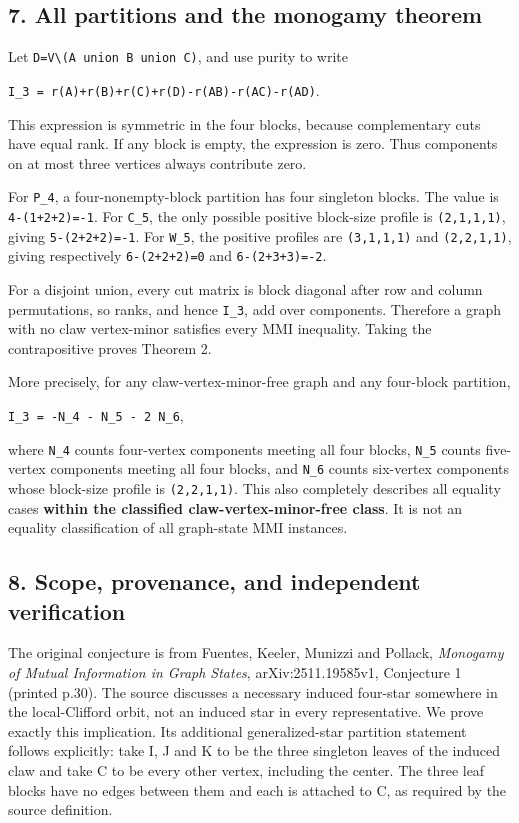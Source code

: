 \documentclass[
  11pt,
]{article}
\begin{document}
\subsection{7. All partitions and the monogamy
theorem}\label{all-partitions-and-the-monogamy-theorem}

Let \texttt{D=V\textbackslash{}(A\ union\ B\ union\ C)}, and use purity
to write

\texttt{I\_3\ =\ r(A)+r(B)+r(C)+r(D)-r(AB)-r(AC)-r(AD)}.

This expression is symmetric in the four blocks, because complementary
cuts have equal rank. If any block is empty, the expression is zero.
Thus components on at most three vertices always contribute zero.

For \texttt{P\_4}, a four-nonempty-block partition has four singleton
blocks. The value is \texttt{4-(1+2+2)=-1}. For \texttt{C\_5}, the only
possible positive block-size profile is \texttt{(2,1,1,1)}, giving
\texttt{5-(2+2+2)=-1}. For \texttt{W\_5}, the positive profiles are
\texttt{(3,1,1,1)} and \texttt{(2,2,1,1)}, giving respectively
\texttt{6-(2+2+2)=0} and \texttt{6-(2+3+3)=-2}.

For a disjoint union, every cut matrix is block diagonal after row and
column permutations, so ranks, and hence \texttt{I\_3}, add over
components. Therefore a graph with no claw vertex-minor satisfies every
MMI inequality. Taking the contrapositive proves Theorem 2.

More precisely, for any claw-vertex-minor-free graph and any four-block
partition,

\texttt{I\_3\ =\ -N\_4\ -\ N\_5\ -\ 2\ N\_6},

where \texttt{N\_4} counts four-vertex components meeting all four
blocks, \texttt{N\_5} counts five-vertex components meeting all four
blocks, and \texttt{N\_6} counts six-vertex components whose block-size
profile is \texttt{(2,2,1,1)}. This also completely describes all
equality cases \textbf{within the classified claw-vertex-minor-free
class}. It is not an equality classification of all graph-state MMI
instances.

\subsection{8. Scope, provenance, and independent
verification}\label{scope-provenance-and-independent-verification}

The original conjecture is from Fuentes, Keeler, Munizzi and Pollack,
\emph{Monogamy of Mutual Information in Graph States},
arXiv:2511.19585v1, Conjecture 1 (printed p.30). The source discusses a
necessary induced four-star somewhere in the local-Clifford orbit, not
an induced star in every representative. We prove exactly this
implication. Its additional generalized-star partition statement follows
explicitly: take I, J and K to be the three singleton leaves of the
induced claw and take C to be every other vertex, including the center.
The three leaf blocks have no edges between them and each is attached to
C, as required by the source definition.
\end{document}

